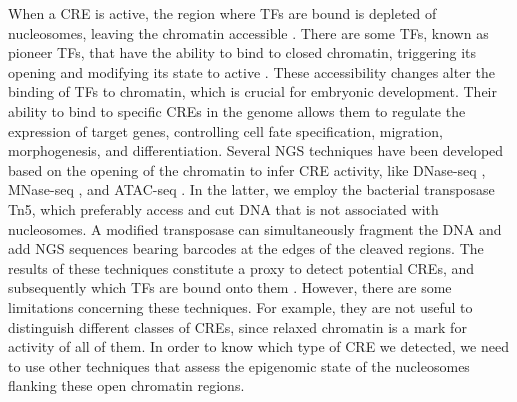 When a CRE is active, the region where TFs are bound is depleted of nucleosomes, leaving the chromatin accessible \parencite{brahma_epigenome_2020}. There are some TFs, known as pioneer TFs, that have the ability to bind to closed chromatin, triggering its opening and modifying its state to active \parencite{larson_pioneering_2021, balsalobre_pioneer_2022}. These accessibility changes alter the binding of TFs to chromatin, which is crucial for embryonic development. Their ability to bind to specific CREs in the genome allows them to regulate the expression of target genes, controlling cell fate specification, migration, morphogenesis, and differentiation. Several NGS techniques have been developed based on the opening of the chromatin to infer CRE activity, like DNase-seq \parencite{boyle_high-resolution_2008, hesselberth_global_2009, song_dnase-seq_2010}, MNase-seq \parencite{yuan_genome-scale_2005}, and ATAC-seq \parencite{buenrostro_transposition_2013}. In the latter, we employ the bacterial transposase Tn5, which preferably access and cut DNA that is not associated with nucleosomes. A modified transposase can simultaneously fragment the DNA and add NGS sequences bearing barcodes at the edges of the cleaved regions. The results of these techniques constitute a proxy to detect potential CREs, and subsequently which TFs are bound onto them \parencite{bentsen_atac-seq_2020}. However, there are some limitations concerning these techniques. For example, they are not useful to distinguish different classes of CREs, since relaxed chromatin is a mark for activity of all of them. In order to know which type of CRE we detected, we need to use other techniques that assess the epigenomic state of the nucleosomes flanking these open chromatin regions.


